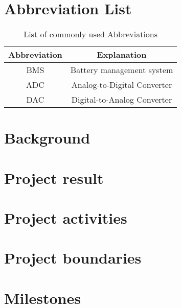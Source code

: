 \documentclass[11pt, a4paper]{report}
\begin{document}
\begin{justify}


\newpage
\tableofcontents
\thispagestyle{empty}

\listoffigures
\thispagestyle{empty}


\listoftables
\thispagestyle{empty}

\newpage
\pagestyle{plain}
\setcounter{page}{1}

\chapter*{Abbreviation List}

\begin{table}[!h]
	\centering
\begin{tabular}{|c|c|}
	\hline
\textbf{Abbreviation} & \textbf{Explanation}        \\ \hline
BMS                   & Battery management system    \\ \hline
ADC                   & Analog-to-Digital Converter \\ \hline
DAC                   & Digital-to-Analog Converter \\ \hline
\end{tabular}
\caption{List of commonly used Abbreviations}
\label{Abbreviation list}
\end{table}

\chapter{Background}
	

\chapter{Project result}
	
	
\chapter{Project activities}
	

\chapter{Project boundaries}
	
	
\chapter{Milestones}
	


\end{justify}
\end{document}
